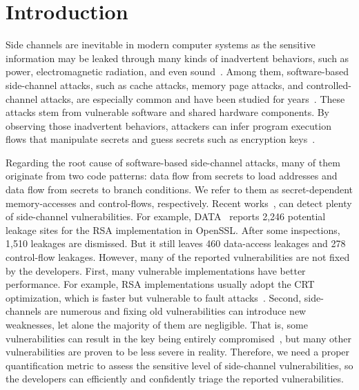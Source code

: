 \section{Introduction} 
Side channels are inevitable in modern computer systems as the sensitive
information may be leaked through many kinds of inadvertent behaviors, such as power,
electromagnetic radiation, and even
sound~\cite{agrawal2002side,kar20178,chari1999towards,217605,genkin2014rsa}.
Among them, software-based side-channel attacks, such as cache attacks, memory page
attacks, and controlled-channel attacks, are especially common and have been
studied for
years~\cite{7163052,217543,217589,lee2017inferring,191010,liu2015last}. These
attacks stem from vulnerable software and shared hardware components.
By observing those inadvertent behaviors, attackers can infer program
execution flows that manipulate secrets and guess secrets such as encryption
keys~\cite{Osvik2006,Gullasch:2011:CGB:2006077.2006784,203878,10.1007/978-3-540-45238-6_6}.


Regarding the root cause of software-based side-channel attacks, many of them originate
from two code patterns: data flow from secrets to load
addresses and data flow from secrets to branch conditions. We refer to them as
secret-dependent memory-accesses and control-flows, respectively. 
Recent works~\cite{203878,217537,Wichelmann:2018:MFF:3274694.3274741,Brotzman19Casym,236338,182946},
can detect plenty of side-channel vulnerabilities. For example,
DATA~\cite{217537} reports 2,246 potential leakage sites for the RSA
implementation in OpenSSL\@. 
After some inspections, 1,510 leakages are dismissed. But it
still leaves 460 data-access leakages and 278 control-flow leakages. 
However, many of the reported vulnerabilities are not fixed by the developers.
First, many vulnerable implementations have better performance. For example,
RSA implementations usually adopt the CRT optimization,
which is faster but vulnerable to fault attacks~\cite{aumuller2002fault}.
Second, side-channels are numerous and fixing old vulnerabilities can introduce new 
weaknesses, let alone the majority of them are negligible. 
That is, some vulnerabilities can result in the key being 
entirely compromised~\cite{184415, aumuller2002fault}, 
but many other vulnerabilities are proven to be less
severe in reality. Therefore, we need a proper quantification metric to 
assess the sensitive level of side-channel vulnerabilities,
so the developers can efficiently and confidently triage the reported vulnerabilities.

